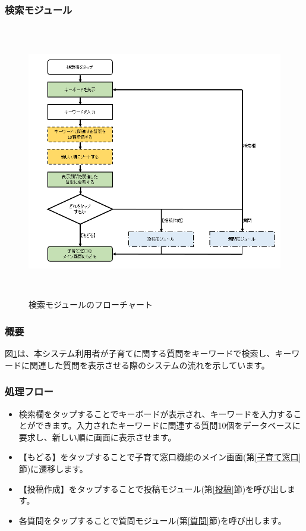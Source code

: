 \documentclass[a4j]{jarticle}
\begin{document}
\subsubsection{検索モジュール\label{検索}} %
\begin{figure}[H]
    \begin{center}
      \includegraphics[height = 12.0cm] {子育て窓口_検索.png} %
    \caption {検索モジュールのフローチャート}
    \label{子育て窓口_検索}
    \end{center}
\end{figure}
\subsubsection*{概要}
図\ref{子育て窓口_検索}は、本システム利用者が子育てに関する質問をキーワードで検索し、キーワードに関連した質問を表示させる際のシステムの流れを示しています。
\subsubsection*{処理フロー}
\begin{itemize}
\item 検索欄をタップすることでキーボードが表示され、キーワードを入力することができます。入力されたキーワードに関連する質問10個をデータベースに要求し、新しい順に画面に表示させます。
\item 【もどる】をタップすることで子育て窓口機能のメイン画面(第\ref{子育て窓口}節)に遷移します。
\item 【投稿作成】をタップすることで投稿モジュール(第\ref{投稿}節)を呼び出します。
\item 各質問をタップすることで質問モジュール(第\ref{質問}節)を呼び出します。


\end{itemize}
\end{document}
